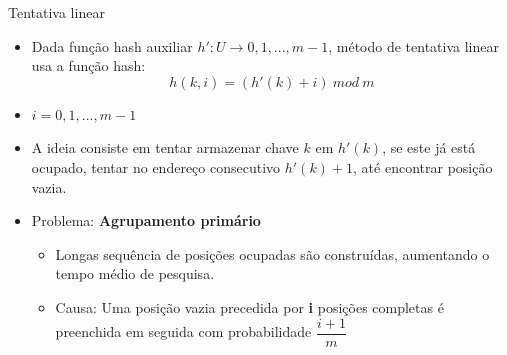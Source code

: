 \documentclass{beamer}
\begin{document}
\begin{frame}{Tentativa linear}
\begin{itemize}
 \item Dada função hash auxiliar $h':U\rightarrow {0,1,...,m-1}$, método de tentativa linear usa a função hash:
 $$h(k,i) = (h'(k) + i) \ mod \ m$$
 \item $i=0,1,...,m-1$
 \item A ideia consiste em tentar armazenar chave $k$ em $h'(k)$, se este já está ocupado, tentar no endereço consecutivo $h'(k) + 1$, até encontrar posição vazia.
\item Problema: \textbf{Agrupamento primário}
\begin{itemize}                                     \item Longas sequência de posições ocupadas são construídas, aumentando o tempo médio de pesquisa. 
\item Causa: Uma posição vazia precedida por \textbf{i} posições completas é preenchida em seguida com probabilidade $\dfrac{i+1}{m}$
\end{itemize}
\end{itemize}
\end{frame}
\end{document}
